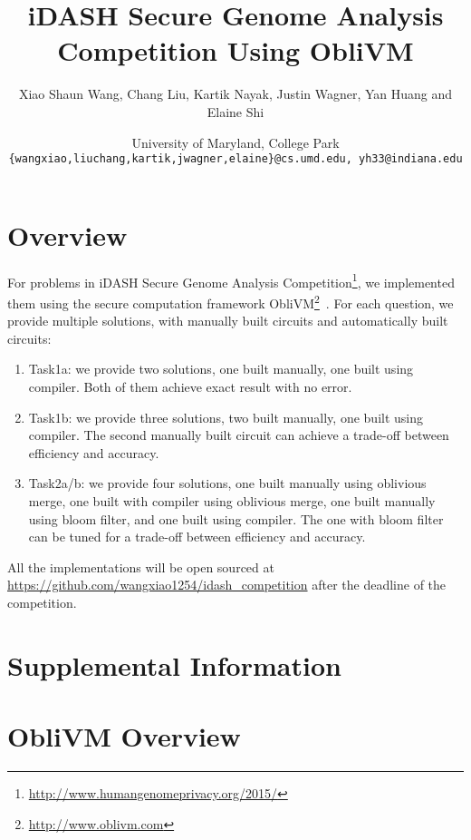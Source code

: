 \documentclass[11pt]{article}
\title{iDASH Secure Genome Analysis Competition Using {\sf ObliVM}}
\author{Xiao Shaun Wang, Chang Liu, Kartik Nayak, Justin Wagner, Yan Huang and Elaine Shi}
\date{University of Maryland, College Park\\
{\tt \{wangxiao,liuchang,kartik,jwagner,elaine\}@cs.umd.edu, yh33@indiana.edu}}
\begin{document}
\maketitle
\section{Overview}
For problems in iDASH Secure Genome Analysis Competition\footnote{\url{http://www.humangenomeprivacy.org/2015/}}, we implemented them using the secure computation framework {\sf ObliVM}\footnote{\url{http://www.oblivm.com}}~\cite{oblivm}.
For each question, we provide multiple solutions, with manually built circuits and automatically built circuits:
\begin{enumerate}
\item Task1a: we provide two solutions, one built manually, one built using compiler. Both of them achieve exact result with no error.
\item Task1b: we provide three solutions, two built manually, one built using compiler. The second manually built circuit can achieve a trade-off between efficiency and accuracy.
\item Task2a/b: we provide four solutions, one built manually using oblivious merge, one built with compiler using oblivious merge, one built manually using bloom filter, and one built using compiler. The one with bloom filter can be tuned for a trade-off between efficiency and accuracy.
\end{enumerate}

All the implementations will be open sourced at \url{https://github.com/wangxiao1254/idash_competition} after the deadline of the competition.



\appendix

\section*{Supplemental Information}
\section{{\sf ObliVM} Overview}
\end{document}
